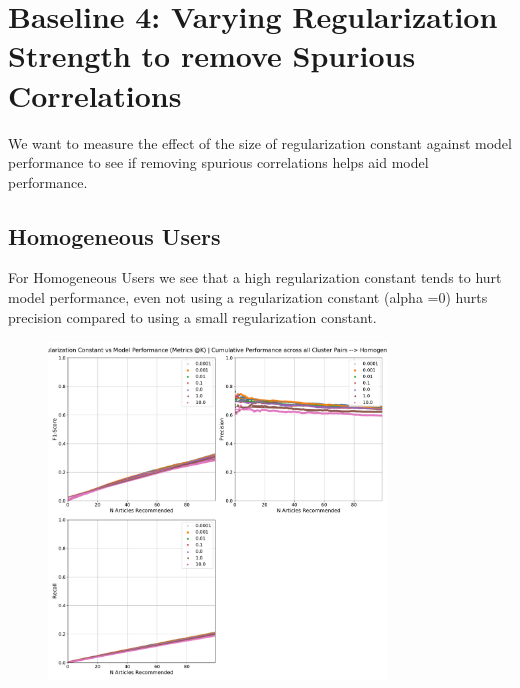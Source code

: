 \documentclass[a4paper,fontsize=8.0pt]{scrartcl}
\begin{document}
\section{Baseline 4: Varying Regularization Strength to remove Spurious Correlations}
\begin{flushleft}
We want to measure the effect of the size of regularization constant against model performance to see if removing spurious correlations helps aid model performance.

\subsection{Homogeneous Users}
\begin{flushleft}
For Homogeneous Users we see that a high regularization constant tends to hurt model performance, even not using a regularization constant (alpha =0) hurts precision compared to using a small regularization constant.
\end{flushleft}
\end{flushleft}
\vspace{-5ex}
\begin{figure}[H]
 \includegraphics[width=0.8\textwidth]{Graphs/regularization_vs_model_performance_cumu_Homogeneous.pdf}
\end{figure}
\end{document}
